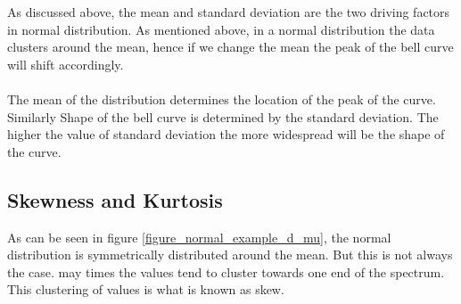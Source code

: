 \documentclass[twoside,12pt]{report}  %
\begin{document}
As discussed above, the mean and standard deviation are the two driving factors in normal distribution. As mentioned above, in a normal distribution the data clusters around the mean, hence if we change the mean the peak of the bell curve will shift accordingly.
\\
\\
The mean of the distribution determines the location of the peak of the curve. Similarly Shape of the bell curve is determined by the standard deviation. The higher the value of standard deviation the more widespread will be the shape of the curve.
\\
\subsection{Skewness and Kurtosis}

As can be seen in figure \ref{figure_normal_example_d_mu}, the normal distribution is symmetrically distributed around the mean. But this is not always the case. may times the values tend to cluster towards one end of the spectrum. This clustering of values is what is known as skew.
\end{document}
